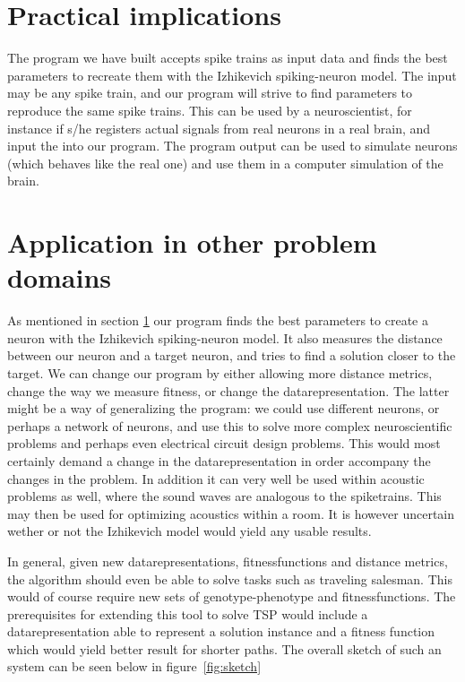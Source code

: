 \documentclass[10pt]{article}
\begin{document}
\section{Practical implications}\label{sec:implications}
The program we have built accepts spike trains as input data and finds the best parameters to recreate them with the Izhikevich spiking-neuron model. The input may be any spike train, and our program will strive to find parameters to reproduce the same spike trains. This can be used by a neuroscientist, for instance if s/he registers actual signals from real neurons in a real brain, and input the into our program. The program output can be used to simulate neurons (which behaves like the real one) and use them in a computer simulation of the brain.

\section{Application in other problem domains}\label{sec:applications}
As mentioned in section \ref{sec:implications} our program finds the best parameters to create a neuron with the Izhikevich spiking-neuron model. It also measures the distance between our neuron and a target neuron, and tries to find a solution closer to the target. We can change our program by either allowing more distance metrics, change the way we measure fitness, or change the datarepresentation. The latter might be a way of generalizing the program: we could use different neurons, or perhaps a network of neurons, and use this to solve more complex neuroscientific problems and perhaps even electrical circuit design problems. This would most certainly demand a change in the datarepresentation in order accompany the changes in the problem. In addition it can very well be used within acoustic problems as well, where the sound waves are analogous to the spiketrains. This may then be used for optimizing acoustics within a room. It is however uncertain wether or not the Izhikevich model would yield any usable results.

In general, given new datarepresentations, fitnessfunctions and distance metrics, the algorithm should even be able to solve tasks such as traveling salesman. This would of course require new sets of genotype-phenotype and fitnessfunctions. The prerequisites for extending this tool to solve TSP would include a datarepresentation able to represent a solution instance and a fitness function which would yield better result for shorter paths. The overall sketch of such an system can be seen below in figure~\ref{fig:sketch}
\end{document}
